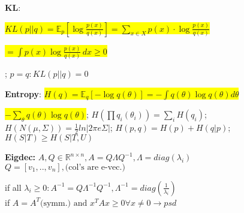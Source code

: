 \documentclass[11pt,landscape,a4paper,fleqn]{article}
\newcommand{\mhl}[1]{\setlength{\fboxsep}{0pt}\colorbox{yellow}{#1}}
\begin{document}
\begin{multicols*}{4}

		\textbf{KL}: {\fontsize{10}{6}\selectfont \mhl{$KL(p||q) = \mathbb{E}_p[\log\frac{p(x)}{q(x)}] = \sum_{x \in X} p(x) \cdot \log \frac{p(x)}{q(x)}$}

		\mhl{$= \int p(x) \log \frac{p(x)}{q(x)} \, dx \geq 0$}}; $p=q: KL(p||q) = 0$


		\textbf{Entropy}: \mhl{{\fontsize{9}{6}\selectfont $H(q) = \mathbb{E}_q[-\log q(\theta)] = - \int q(\theta)\log q(\theta) d\theta $}}

		\mhl{{\fontsize{9.3}{6}\selectfont $- \sum_\theta q(\theta) \log q(\theta)$}};
	$H(\prod q_i(\theta_i)) = \sum_i H(q_i)$; $H(N(\mu, \Sigma)) = \frac{1}{2}  ln|2\pi e \Sigma|$;
	$H(p,q) = H(p) + H(q | p)$;
	$H(S | T) \geq H(S | T, U)$





		\iffalse
		\textbf{Eigdec:}
	$A,Q \in \mathbb{R}^{n\times n}, A=Q\Lambda Q^{-1},\! \Lambda = diag(\lambda_i)$\\
	$Q=[v_1,..,v_n], \text{(col's are e-vec.)}$

		if all $\lambda_i\geq0: A^{-1}=Q\Lambda^{-1}Q^{-1},\Lambda^{-1}=diag(\frac{1}{\lambda_i})$\\
		if $A=A^T\text{(symm.) and }x^TAx\geq0 \forall x \neq 0 \rightarrow psd$


\end{multicols*}
\end{document}
